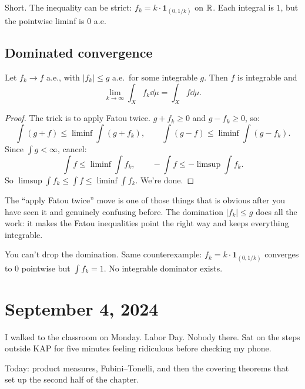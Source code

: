 Short. The inequality can be strict: $f_k = k \cdot \mathbf{1}_{(0,1/k)}$
on $\mathbb{R}$. Each integral is $1$, but the pointwise liminf is $0$ a.e.


\subsection{Dominated convergence}\label{subsec:dct}

\begin{theorem}\label{thm:dct}
Let $f_k \to f$ a.e., with $|f_k| \le g$ a.e.\ for some integrable $g$.
Then $f$ is integrable and
\[
  \lim_{k \to \infty} \int_X f_k \dd\mu = \int_X f \dd\mu.
\]
\end{theorem}

\begin{proof}
The trick is to apply Fatou twice. $g + f_k \ge 0$ and $g - f_k \ge 0$, so:
\[
  \int (g + f) \le \liminf \int (g + f_k), \qquad
  \int (g - f) \le \liminf \int (g - f_k).
\]
Since $\int g < \infty$, cancel:
\[
  \int f \le \liminf \int f_k, \qquad
  -\int f \le -\limsup \int f_k.
\]
So $\limsup \int f_k \le \int f \le \liminf \int f_k$. We're done.
\qedhere
\end{proof}

The ``apply Fatou twice'' move is one of those things that is obvious after
you have seen it and genuinely confusing before. The domination $|f_k| \le g$
does all the work: it makes the Fatou inequalities point the right
way and keeps everything integrable.

\begin{remark}\label{rem:dct-counterex}
You can't drop the domination. Same counterexample:
$f_k = k \cdot \mathbf{1}_{(0,1/k)}$ converges to $0$ pointwise but
$\int f_k = 1$. No integrable dominator exists.
\end{remark}


\section{September 4, 2024}\label{sec:lec3}

I walked to the classroom on Monday. Labor Day. Nobody there.
Sat on the steps outside KAP for five minutes feeling ridiculous before checking my phone.

Today: product measures, Fubini--Tonelli, and then the covering theorems
that set up the second half of the chapter.

